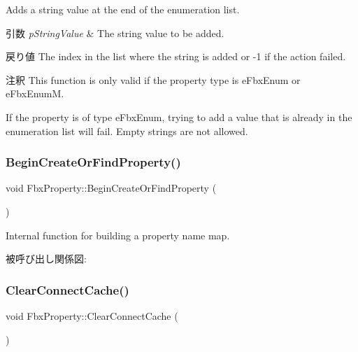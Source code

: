 Adds a string value at the end of the enumeration list. 
\begin{DoxyParams}{引数}
{\em p\+String\+Value} & The string value to be added. \\
\hline
\end{DoxyParams}
\begin{DoxyReturn}{戻り値}
The index in the list where the string is added or -\/1 if the action failed. 
\end{DoxyReturn}
\begin{DoxyRemark}{注釈}
This function is only valid if the property type is e\+Fbx\+Enum or e\+Fbx\+EnumM. 

If the property is of type e\+Fbx\+Enum, trying to add a value that is already in the enumeration list will fail. Empty strings are not allowed. 
\end{DoxyRemark}
\mbox{\label{class_fbx_property_a9305ebb4cec09a9a9dea0a36f38e2712}} 
\subsubsection{\texorpdfstring{Begin\+Create\+Or\+Find\+Property()}{BeginCreateOrFindProperty()}}
{\footnotesize\ttfamily void Fbx\+Property\+::\+Begin\+Create\+Or\+Find\+Property (\begin{DoxyParamCaption}{ }\end{DoxyParamCaption})}



Internal function for building a property name map. 

被呼び出し関係図\+:
\mbox{\label{class_fbx_property_abc41950bc933e9bc5454e1b5b39c4d5c}} 
\subsubsection{\texorpdfstring{Clear\+Connect\+Cache()}{ClearConnectCache()}}
{\footnotesize\ttfamily void Fbx\+Property\+::\+Clear\+Connect\+Cache (\begin{DoxyParamCaption}{ }\end{DoxyParamCaption})}



